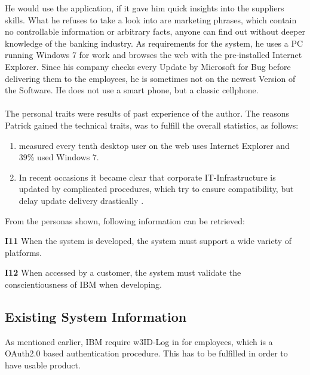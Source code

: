 He would use the application, if it gave him quick insights into the suppliers skills. What he refuses to take a look into are marketing phrases, which contain no controllable information or arbitrary facts, anyone can find out without deeper knowledge of the banking industry. As requirements for the system, he uses a PC running Windows 7 for work and browses the web with the pre-installed Internet Explorer. Since his company checks every Update by Microsoft for Bug before delivering them to the employees, he is sometimes not on the newest Version of the Software. He does not use a smart phone, but a classic cellphone.

\paragraph{}
The personal traits were results of past experience of the author. The reasons Patrick gained the technical traits, was to fulfill the overall statistics, as follows:
\begin{enumerate}
    \item \textcite{StatCounter.2017} measured every tenth desktop user on the web uses Internet Explorer and 39\% used Windows 7. 
    \item In recent occasions it became clear that corporate IT-Infrastructure is updated by complicated procedures, which try to ensure compatibility, but delay update delivery drastically \parencites{Gierow.2017}{Zivadinovic.13.05.2017}.
\end{enumerate}

From the personas shown, following information can be retrieved:

\begin{closeItem}
    \item [\textbf{I11}] When the system is developed, the system must support a wide variety of platforms.
    \item [\textbf{I12}] When accessed by a customer, the system must validate the conscientiousness of IBM when developing.
\end{closeItem}

\subsection{Existing System Information}
As mentioned earlier, IBM require w3ID-Log in for employees, which is a OAuth2.0 \parencite[cf.][]{InternetEngineeringTaskForce.2012} based authentication procedure. This has to be fulfilled in order to have  usable product. 

